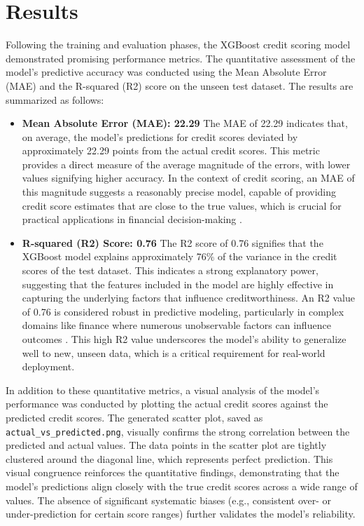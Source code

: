 \documentclass{article}
\begin{document}
\section{Results}

Following the training and evaluation phases, the XGBoost credit scoring model demonstrated promising performance metrics. The quantitative assessment of the model's predictive accuracy was conducted using the Mean Absolute Error (MAE) and the R-squared (R2) score on the unseen test dataset. The results are summarized as follows:

\begin{itemize}
    \item \textbf{Mean Absolute Error (MAE): 22.29}
    The MAE of 22.29 indicates that, on average, the model's predictions for credit scores deviated by approximately 22.29 points from the actual credit scores. This metric provides a direct measure of the average magnitude of the errors, with lower values signifying higher accuracy. In the context of credit scoring, an MAE of this magnitude suggests a reasonably precise model, capable of providing credit score estimates that are close to the true values, which is crucial for practical applications in financial decision-making \cite{hyndman2006another}.

    \item \textbf{R-squared (R2) Score: 0.76}
    The R2 score of 0.76 signifies that the XGBoost model explains approximately 76\% of the variance in the credit scores of the test dataset. This indicates a strong explanatory power, suggesting that the features included in the model are highly effective in capturing the underlying factors that influence creditworthiness. An R2 value of 0.76 is considered robust in predictive modeling, particularly in complex domains like finance where numerous unobservable factors can influence outcomes \cite{chicco2020advantages}. This high R2 value underscores the model's ability to generalize well to new, unseen data, which is a critical requirement for real-world deployment.
\end{itemize}

In addition to these quantitative metrics, a visual analysis of the model's performance was conducted by plotting the actual credit scores against the predicted credit scores. The generated scatter plot, saved as \texttt{actual\_vs\_predicted.png}, visually confirms the strong correlation between the predicted and actual values. The data points in the scatter plot are tightly clustered around the diagonal line, which represents perfect prediction. This visual congruence reinforces the quantitative findings, demonstrating that the model's predictions align closely with the true credit scores across a wide range of values. The absence of significant systematic biases (e.g., consistent over- or under-prediction for certain score ranges) further validates the model's reliability.
\end{document}
